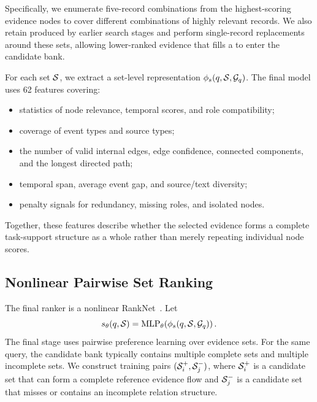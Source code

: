 Specifically, we enumerate five-record combinations from the highest-scoring evidence nodes to cover different combinations of highly relevant records. %
We also retain  produced by earlier search stages and perform single-record replacements around these sets, allowing lower-ranked evidence that fills a  to enter the candidate bank.

For each set $\mathcal{S}$, we extract a set-level representation $\phi_s(q,\mathcal{S},\mathcal{G}_q)$. The final model uses 62 features covering:
\begin{itemize}
    \item statistics of node relevance, temporal scores, and role compatibility;
    \item coverage of event types and source types;
    \item the number of valid internal edges, edge confidence, connected components, and the longest directed path;
    \item temporal span, average event gap, and source/text diversity;
    \item penalty signals for redundancy, missing roles, and isolated nodes.
\end{itemize}
Together, these features describe whether the selected evidence forms a complete task-support structure as a whole rather than merely repeating individual node scores.

\subsection{Nonlinear Pairwise Set Ranking}

The final ranker is a   nonlinear RankNet~\cite{burges2005ranknet}. Let
\begin{equation}
s_{\theta}(q,\mathcal{S})
=
\operatorname{MLP}_{\theta}
\!\left(
\phi_s(q,\mathcal{S},\mathcal{G}_q)
\right).
\end{equation}
The final stage uses pairwise preference learning over evidence sets. For the same query, the candidate bank typically contains multiple complete sets and multiple incomplete sets. We construct training pairs
$(\mathcal{S}_i^+,\mathcal{S}_j^-)$,
where $\mathcal{S}_i^+$ is a candidate set that can form a complete reference evidence flow and $\mathcal{S}_j^-$ is a candidate set that misses  or contains an incomplete relation structure.

